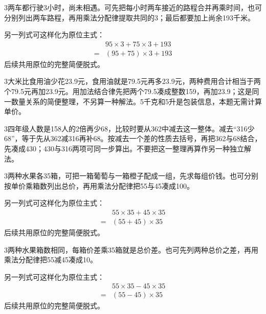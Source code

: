 \documentclass[multi=snippet,border={5bp 20bp 5bp 5bp}]{standalone}
\newenvironment{snippet}[3]{\begin{minipage}{#1bp}\color{answerred}\fontsize{#2}{#3}\selectfont\raggedright}{\end{minipage}}
\begin{document}
\begin{snippet}{505}{11.5}{14}\begin{multicols}{3}\raggedcolumns 两车都行驶3小时，尚未相遇。可先把每小时两车接近的路程合并再乘时间，也可分别列出两车路程，再用乘法分配律提取共同的3；最后都要加上尚余193千米。\par 另一列式可这样化为原位主式：\[\begin{aligned}&95\times3+75\times3+193\\={}&(95+75)\times3+193\end{aligned}\]后续共用原位的完整简便脱式。\end{multicols}\end{snippet}
\begin{snippet}{505}{11.5}{14}\begin{multicols}{3}\raggedcolumns 大米比食用油少花23.9元，食用油就是79.5元再多23.9元，两种费用合计相当于两个79.5元再加23.9元。用加法结合律先把两个79.5凑成整数159，再加23.9；这是同一数量关系的简便整理，不另算一种解法。5千克和5升是包装信息，本题无需计算单价。\end{multicols}\end{snippet}
\begin{snippet}{505}{11.5}{14}\begin{multicols}{3}\raggedcolumns 四年级人数是158人的2倍再少68，比较时要从362中减去这一整体。减去“316少68”，等于先从362减316再补68。按减去一个差的性质去括号，再把362与68结合，先凑成430；430与316两项可同一步算出。不要把这一整理再算作另一种独立解法。\end{multicols}\end{snippet}
\begin{snippet}{505}{11.5}{14}\begin{multicols}{3}\raggedcolumns 两种水果各35箱，可把一箱葡萄与一箱橙子配成一组，先求每组价钱。也可分别按单价乘箱数列出总价，再用乘法分配律把55与45凑成100。\par 另一列式可这样化为原位主式：\[\begin{aligned}&55\times35+45\times35\\={}&(55+45)\times35\end{aligned}\]后续共用原位的完整简便脱式。\end{multicols}\end{snippet}
\begin{snippet}{505}{11.5}{14}\begin{multicols}{3}\raggedcolumns 两种水果箱数相同，每箱价差乘35箱就是总价差。也可先列两种总价之差，再用乘法分配律把55减45凑成10。\par 另一列式可这样化为原位主式：\[\begin{aligned}&55\times35-45\times35\\={}&(55-45)\times35\end{aligned}\]后续共用原位的完整简便脱式。\end{multicols}\end{snippet}
\end{document}

